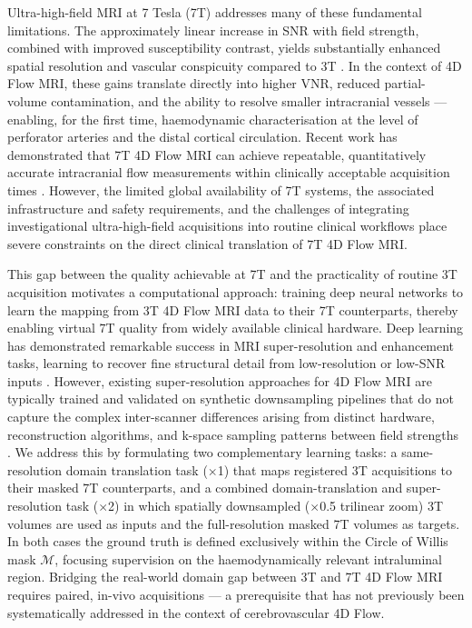 \documentclass[11pt]{article}
\begin{document}
Ultra-high-field MRI at 7 Tesla (7T) addresses many of these fundamental limitations. The approximately linear increase in SNR with field strength, combined with improved susceptibility contrast, yields substantially enhanced spatial resolution and vascular conspicuity compared to 3T \cite{kara2022_7t,smra2024}. In the context of 4D Flow MRI, these gains translate directly into higher VNR, reduced partial-volume contamination, and the ability to resolve smaller intracranial vessels --- enabling, for the first time, haemodynamic characterisation at the level of perforator arteries and the distal cortical circulation. Recent work has demonstrated that 7T 4D Flow MRI can achieve repeatable, quantitatively accurate intracranial flow measurements within clinically acceptable acquisition times \cite{mccormick2020_7t4dflow}. However, the limited global availability of 7T systems, the associated infrastructure and safety requirements, and the challenges of integrating investigational ultra-high-field acquisitions into routine clinical workflows place severe constraints on the direct clinical translation of 7T 4D Flow MRI.

This gap between the quality achievable at 7T and the practicality of routine 3T acquisition motivates a computational approach: training deep neural networks to learn the mapping from 3T 4D Flow MRI data to their 7T counterparts, thereby enabling virtual 7T quality from widely available clinical hardware. Deep learning has demonstrated remarkable success in MRI super-resolution and enhancement tasks, learning to recover fine structural detail from low-resolution or low-SNR inputs \cite{duffy2022sr,wang2024srrt}. However, existing super-resolution approaches for 4D Flow MRI are typically trained and validated on synthetic downsampling pipelines that do not capture the complex inter-scanner differences arising from distinct hardware, reconstruction algorithms, and k-space sampling patterns between field strengths \cite{ferdian2020,elahmar2023}. We address this by formulating two complementary learning tasks: a same-resolution domain translation task ($\times$1) that maps registered 3T acquisitions to their masked 7T counterparts, and a combined domain-translation and super-resolution task ($\times$2) in which spatially downsampled ($\times$0.5 trilinear zoom) 3T volumes are used as inputs and the full-resolution masked 7T volumes as targets. In both cases the ground truth is defined exclusively within the Circle of Willis mask $\mathcal{M}$, focusing supervision on the haemodynamically relevant intraluminal region. Bridging the real-world domain gap between 3T and 7T 4D Flow MRI requires paired, in-vivo acquisitions --- a prerequisite that has not previously been systematically addressed in the context of cerebrovascular 4D Flow.
\end{document}
